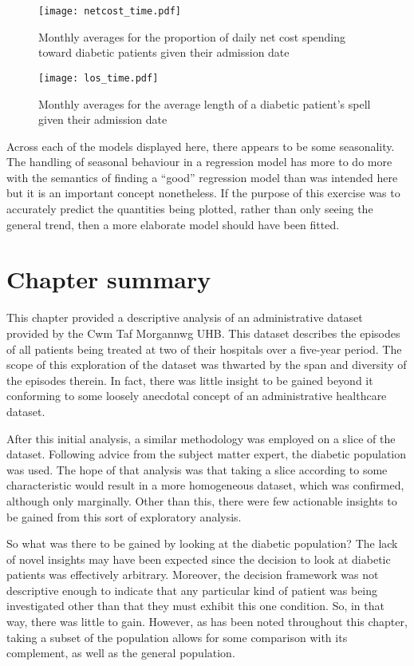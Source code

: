\begin{figure}
    \centering
    \texttt{[image: netcost\_time.pdf]}
    \caption{Monthly averages for the proportion of daily net cost spending
        toward diabetic patients given their admission date
    }\label{fig:netcost_proportions}
\end{figure}

\begin{figure}
    \centering
    \texttt{[image: los\_time.pdf]}
    \caption{Monthly averages for the average length of a diabetic patient's
        spell given their admission date
    }\label{fig:los_time}
\end{figure}

Across each of the models displayed here, there appears to be some seasonality.
The handling of seasonal behaviour in a regression model has more to do more
with the semantics of finding a ``good'' regression model than was intended here
but it is an important concept nonetheless. If the purpose of this exercise was
to accurately predict the quantities being plotted, rather than only seeing the
general trend, then a more elaborate model should have been fitted.


\section{Chapter summary}\label{sec:summary}

This chapter provided a descriptive analysis of an administrative dataset
provided by the Cwm Taf Morgannwg UHB. This dataset describes the episodes of
all patients being treated at two of their hospitals over a five-year period.
The scope of this exploration of the dataset was thwarted by the span and
diversity of the episodes therein. In fact, there was little insight to be
gained beyond it conforming to some loosely anecdotal concept of an
administrative healthcare dataset.

After this initial analysis, a similar methodology was employed on a slice of
the dataset. Following advice from the subject matter expert, the diabetic
population was used. The hope of that analysis was that taking a slice according
to some characteristic would result in a more homogeneous dataset, which was
confirmed, although only marginally. Other than this, there were few actionable
insights to be gained from this sort of exploratory analysis.

So what was there to be gained by looking at the diabetic population? The lack
of novel insights may have been expected since the decision to look at diabetic
patients was effectively arbitrary. Moreover, the decision framework was not
descriptive enough to indicate that any particular kind of patient was being
investigated other than that they must exhibit this one condition. So, in that
way, there was little to gain. However, as has been noted throughout this
chapter, taking a subset of the population allows for some comparison with its
complement, as well as the general population.

